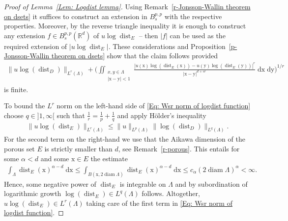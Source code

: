 \documentclass[10pt,leqno]{amsart}
\theoremstyle{definition}
\numberwithin{equation}{section}
\begin{document}
\begin{proof}[Proof of Lemma~\ref{Lem: Logdist lemma}]
Using Remark~\ref{r-Jonsson-Wallin theorem on dsets} it suffices to construct
an extension in $B_s^{p,p}$ with the respective properties. Moreover, by the
reverse triangle inequality it is enough to construct any extension $f \in
B_s^{p,p}({{\mathbb R}}^d)$ of $u \log {\operatorname{dist}}_E$ -- then $|f|$ can be used as the required
extension of $|u \log {\operatorname{dist}}_E|$. These considerations and
Proposition~\ref{p-Jonsson-Wallin theorem on dsets} show that the claim follows
provided
\begin{align}
\label{Eq: Wsr norm of logdist function}
 \|u \log({\operatorname{dist}}_D)\|_{L^r(\Lambda)} + \bigg(\iint_{\substack{x,y \in \Lambda \\
|{{\mathrm x}}-{{\mathrm y}}| < 1}}  \frac{|u({{\mathrm x}})\log({\operatorname{dist}}_E({{\mathrm x}}))-
u({{\mathrm y}})\log({\operatorname{dist}}_E({{\mathrm y}}))|^r}{|{{\mathrm x}}-{{\mathrm y}}|^{d+sr}} \; {{\mathrm d}} {{\mathrm x}} \; {{\mathrm d}} {{\mathrm y}} \bigg)^{1/r}
\end{align}
is finite. 

To bound the $L^r$ norm on the left-hand side of \eqref{Eq: Wsr norm of logdist
function} choose $q \in {]1,\infty[}$ such that $\frac{1}{r} = \frac{1}{p} +
\frac{1}{q}$ and apply H\"older's inequality
\begin{align*}
 \|u \log({\operatorname{dist}}_E)\|_{L^r(\Lambda)} \leq \|u\|_{L^p(\Lambda)}
\|\log({\operatorname{dist}}_D)\|_{L^q(\Lambda)}.
\end{align*}
For the second term on the right-hand we use that the Aikawa dimension of the
porous set $E$ is strictly smaller than $d$, see Remark~\ref{r-porous}. This
entails for some $\alpha < d$ and some ${{\mathrm x}} \in E$ the estimate
\begin{align*}
 \int_\Lambda {\operatorname{dist}}_E({{\mathrm x}})^{\alpha-d} \; {{\mathrm d}} {{\mathrm x}} \leq \int_{B({{\mathrm x}},2 {\operatorname{diam}} \Lambda)}
{\operatorname{dist}}_E({{\mathrm x}})^{\alpha-d} \; {{\mathrm d}} {{\mathrm x}} \leq c_\alpha (2 {\operatorname{diam}} \Lambda)^\alpha < \infty.
\end{align*}
Hence, some negative power of ${\operatorname{dist}}_E$ is integrable on $\Lambda$ and by
subordination of logarithmic growth $\log({\operatorname{dist}}_E) \in L^q(\Lambda)$ follows.
Altogether, $u \log({\operatorname{dist}}_E) \in L^r(\Lambda)$ taking care of the first term in
\eqref{Eq: Wsr norm of logdist function}.


\end{proof}
\end{document}

